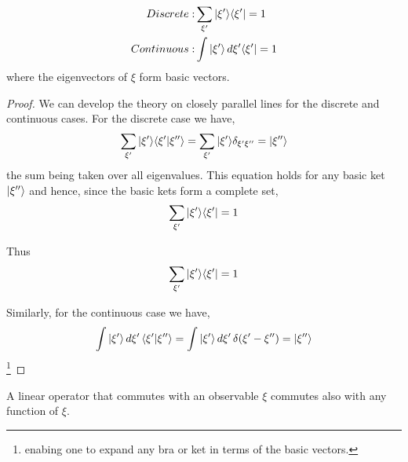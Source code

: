 \begin{theorem}

\begin{align}
Discrete: & \sum_{\xi'} | \xi' \rangle\langle \xi' | =1 \\
Continuous: & \int | \xi' \rangle \, d{\xi'} \langle \xi' | =1
\end{align}
where the eigenvectors of $\xi$ form basic vectors.
\end{theorem}
\begin{proof}
We can develop the theory on closely parallel lines for the discrete and continuous cases. For the discrete case we have,
\begin{equation}
\sum_{\xi'}| \xi' \rangle\langle \xi' | \xi'' \rangle= \sum_{\xi'}| \xi' \rangle\delta_{\xi'\xi''}=| \xi'' \rangle
\end{equation}
the sum being taken over all eigenvalues. This equation holds for any basic ket $| \xi'' \rangle$ and hence, since the basic kets form a complete set,
\begin{equation}
\sum_{\xi'}| \xi' \rangle\langle \xi' |=1
\end{equation}

Thus
\begin{equation}
\sum_{\xi'} | \xi' \rangle\langle \xi' | =1
\end{equation}

Similarly, for the continuous case we have,
\begin{equation}
\int | \xi' \rangle \, d\xi' \, \langle \xi' | \xi'' \rangle =\int | \xi' \rangle \, d \xi' \, \delta(\xi'-\xi'') = | \xi'' \rangle
\end{equation}\footnote{enabing one to expand any bra or ket in terms of the basic vectors.}
\end{proof}

\begin{theorem}
A linear operator that commutes with an observable $\xi$ commutes also with any function of $\xi$.
\end{theorem}

